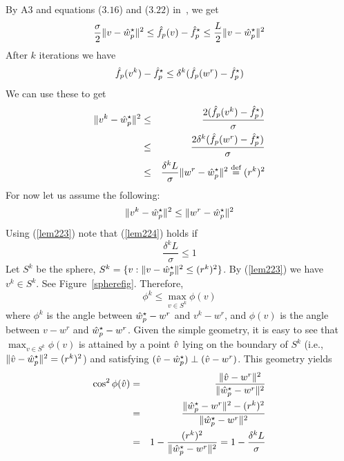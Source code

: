 By A3 and equations ($3.16$) and ($3.22$) in~\cite{smola2008}, we get
\begin{equation}
\frac{\sigma}{2} \|v-\hat{w}_p^\star\|^2 \le \hat{f}_p(v) - \hat{f}_p^\star \le \frac{L}{2} \|v-\hat{w}_p^\star\|^2
\label{lem221}
\end{equation}
After $k$ iterations we have
\begin{equation}
\hat{f}_p(v^k) - \hat{f}_p^\star \le \delta^k (\hat{f}_p(w^r) - \hat{f}_p^\star)
\label{lem222}
\end{equation}
We can use these to get
\begin{eqnarray}
\|v^k-\hat{w}_p^\star\|^2 &\le& \frac{2(\hat{f}_p(v^k)-\hat{f}_p^\star)}{\sigma} \nonumber \\
                        &\le& \frac{2\delta^k (\hat{f}_p(w^r)-\hat{f}_p^\star)}{\sigma} \nonumber \\
                        &\le& \frac{\delta^kL}{\sigma} \|w^r-\hat{w}_p^\star\|^2 \stackrel{\text{def}}{=} (r^k)^2
\label{lem223}
\end{eqnarray}
For now let us assume the following:
\begin{equation}
\|v^k-\hat{w}_p^\star\|^2 \le \|w^r-\hat{w}_p^\star\|^2
\label{lem224}
\end{equation}
Using (\ref{lem223}) note that (\ref{lem224}) holds if
\begin{equation}
\frac{\delta^kL}{\sigma} \le 1
\label{lem225}
\end{equation}
Let $S^k$ be the sphere, $S^k = \{ v : \|v-\hat{w}_p^\star\|^2 \le (r^k)^2 \}$. By (\ref{lem223})
we have $v^k\in S^k$. See Figure~\ref{spherefig}. Therefore,
\begin{equation}
\phi^k \le \max_{v\in S^k} \phi(v)
\label{lem226}
\end{equation}
where $\phi^k$ is the angle between $\hat{w}_p^\star-w^r$ and $v^k-w^r$, and $\phi(v)$ is the angle between $v-w^r$ and $\hat{w}_p^\star-w^r$. Given the simple geometry, it is easy to see that $\max_{v\in S^k} \phi(v)$ is attained by a point $\hat{v}$ lying on the boundary of $S^k$ (i.e., $\|\hat{v}-\hat{w}_p^\star\|^2 = (r^k)^2$) and satisfying $(\hat{v}-\hat{w}_p^\star)\perp (\hat{v}-w^r)$. This geometry yields
\begin{eqnarray}
\cos^2 \phi(\hat{v}) &=& \frac{\|\hat{v}-w^r\|^2}{\|\hat{w}_p^\star-w^r\|^2} \nonumber \\
                   &=& \frac{\|\hat{w}_p^\star-w^r\|^2-(r^k)^2}{\|\hat{w}_p^\star-w^r\|^2} \nonumber \\
                   &=& 1-\frac{(r^k)^2}{\|\hat{w}_p^\star-w^r\|^2} = 1-\frac{\delta^kL}{\sigma}
\label{lem227}
\end{eqnarray}
